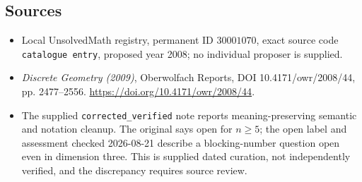 \documentclass[11pt]{article}
\begin{document}
\subsection{Sources}
\begin{itemize}
\item Local UnsolvedMath registry, permanent ID \(30001070\), exact source code \texttt{catalogue entry}, proposed year 2008; no individual proposer is supplied.
\item \emph{Discrete Geometry (2009)}, Oberwolfach Reports, DOI 10.4171/owr/2008/44, pp. 2477--2556. \url{https://doi.org/10.4171/owr/2008/44}.
\item The supplied \texttt{corrected\_verified} note reports meaning-preserving semantic and notation cleanup. The original says open for \(n\geq5\); the open label and assessment checked 2026-08-21 describe a blocking-number question open even in dimension three. This is supplied dated curation, not independently verified, and the discrepancy requires source review.
\end{itemize}
\end{document}

